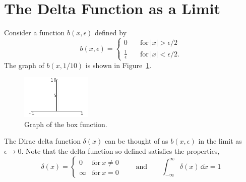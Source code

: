 \section{The Delta Function as a Limit}


Consider a function $b(x,\epsilon)$ defined by
\[ 
b(x,\epsilon) = 
\begin{cases}
  0               &\mathrm{for}\ |x| > \epsilon/2 \\
  \frac{1}{\epsilon} \quad &\mathrm{for}\ |x| < \epsilon/2.
\end{cases}
\]
The graph of $b(x, 1/10)$ is shown in Figure~\ref{epsilon}.

\begin{figure}[h!]
  \begin{center}
    \includegraphics[width=0.3\textwidth]{ode/inhomogeneous/epsilon}
    \caption{Graph of the box function.}
    \label{epsilon}
  \end{center}
\end{figure}


The Dirac delta function $\delta(x)$ can be thought of as $b(x,\epsilon)$ in
the limit as $\epsilon \to 0$. 
Note that the delta function so defined satisfies the properties,
\[ 
\delta(x) = 
\begin{cases}
  0 & \mathrm{for}\ x \neq 0 \\
  \infty & \mathrm{for}\ x = 0
\end{cases}
\qquad \mathrm{and} \qquad
\int_{-\infty}^\infty \delta(x)\,\dd x = 1 
\]



